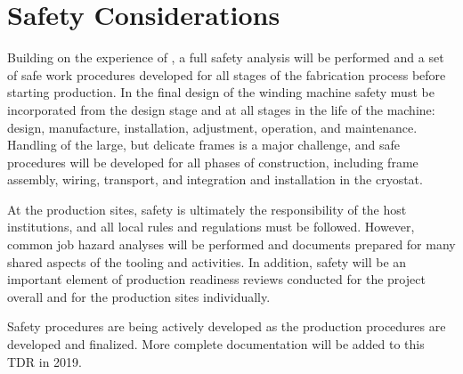\section{Safety Considerations}
\label{sec:fdsp-apa-safety}

Building on the experience of , a full safety analysis will be performed and a set of safe work procedures developed for all stages of the fabrication process before starting   production.  In the final design of the winding machine safety must be incorporated from the design stage and at all stages in the life of the machine: design, manufacture, installation, adjustment, operation, and maintenance.  Handling of the large, but delicate frames is a major challenge, and safe procedures will be developed for all phases of construction, including frame assembly, wiring, transport, and integration and installation in the cryostat.         

At the  production sites, safety is ultimately the responsibility of the host institutions, and all local rules and regulations must be followed.  However, common job hazard analyses will be performed and documents prepared for many shared aspects of the tooling and activities.  In addition, safety will be an important element of production readiness reviews conducted for the project overall and for the production sites individually.   

Safety procedures are being actively developed as the production procedures are developed and finalized.  More complete documentation will be added to this TDR in 2019.  
